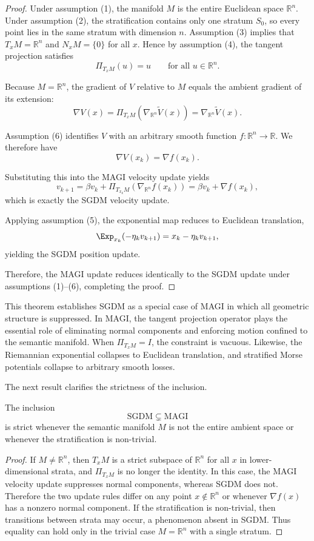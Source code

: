 \documentclass[12pt]{article}
\begin{document}
\begin{proof}
Under assumption (1), the manifold $M$ is the entire Euclidean space $\mathbb{R}^n$. Under assumption (2), the stratification contains only one stratum $S_0$, so every point lies in the same stratum with dimension $n$. Assumption (3) implies that $T_xM = \mathbb{R}^n$ and $N_xM = \{0\}$ for all $x$. Hence by assumption (4), the tangent projection satisfies
\[
\Pi_{T_xM}(u) = u \qquad \text{for all } u \in \mathbb{R}^n.
\]

Because $M = \mathbb{R}^n$, the gradient of $V$ relative to $M$ equals the ambient gradient of its extension:
\[
\nabla V(x)
=
\Pi_{T_xM}(\nabla_{\mathbb{R}^n}\widetilde{V}(x))
=
\nabla_{\mathbb{R}^n}\widetilde{V}(x).
\]

Assumption (6) identifies $V$ with an arbitrary smooth function $f : \mathbb{R}^n \to \mathbb{R}$. We therefore have
\[
\nabla V(x_k) = \nabla f(x_k).
\]

Substituting this into the MAGI velocity update yields
\[
v_{k+1}
=
\beta v_k
+
\Pi_{T_{x_k}M}(\nabla_{\mathbb{R}^n} f(x_k))
=
\beta v_k + \nabla f(x_k),
\]
which is exactly the SGDM velocity update.

Applying assumption (5), the exponential map reduces to Euclidean translation,
\[
\Exp_{x_k}(-\eta_k v_{k+1})
=
x_k - \eta_k v_{k+1},
\]
yielding the SGDM position update.

Therefore, the MAGI update reduces identically to the SGDM update under assumptions (1)--(6), completing the proof.
\end{proof}

This theorem establishes SGDM as a special case of MAGI in which all geometric structure is suppressed. In MAGI, the tangent projection operator plays the essential role of eliminating normal components and enforcing motion confined to the semantic manifold. When $\Pi_{T_xM} = I$, the constraint is vacuous. Likewise, the Riemannian exponential collapses to Euclidean translation, and stratified Morse potentials collapse to arbitrary smooth losses.

The next result clarifies the strictness of the inclusion.

\begin{corollary}
The inclusion
\[
\mathrm{SGDM} \subsetneq \mathrm{MAGI}
\]
is strict whenever the semantic manifold $M$ is not the entire ambient space or whenever the stratification is non-trivial.
\end{corollary}

\begin{proof}
If $M \neq \mathbb{R}^n$, then $T_xM$ is a strict subspace of $\mathbb{R}^n$ for all $x$ in lower-dimensional strata, and $\Pi_{T_xM}$ is no longer the identity. In this case, the MAGI velocity update suppresses normal components, whereas SGDM does not. Therefore the two update rules differ on any point $x \notin \mathbb{R}^n$ or whenever $\nabla f(x)$ has a nonzero normal component. If the stratification is non-trivial, then transitions between strata may occur, a phenomenon absent in SGDM. Thus equality can hold only in the trivial case $M = \mathbb{R}^n$ with a single stratum.
\end{proof}
\end{document}
